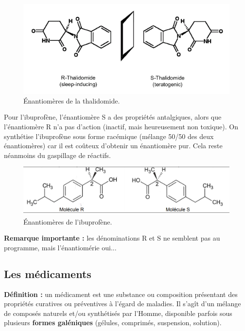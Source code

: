 \documentclass[11pt,a4paper]{report}
\begin{document}
\begin{figure}[h!]
	\begin{center}
  		\includegraphics[scale = 0.8]{thalidomide.png}
	\caption{Énantiomères de la thalidomide.}
	\end{center}
\end{figure}

Pour l'ibuprofène, l'énantiomère S a des propriétés antalgiques, alors que l'énantiomère R n'a pas d'action (inactif, mais heureusement non toxique). On synthétise l'ibuprofène sous forme racémique (mélange 50/50 des deux énantiomères) car il est coûteux d'obtenir un énantiomère pur. Cela reste néanmoins du gaspillage de réactifs.\\

\begin{figure}[h!]
	\begin{center}
  		\includegraphics[scale = 0.5]{ibuprofene.png}
	\caption{Énantiomères de l'ibuprofène.}
	\end{center}
\end{figure}

\textbf{Remarque importante :} les dénominations R et S ne semblent pas au programme, mais l'énantiomérie oui...

\newpage
\subsection{Les médicaments}

\textbf{Définition :} un médicament est une substance ou composition présentant des propriétés curatives ou préventives à l'égard de maladies. Il s'agît d'un mélange de composés naturels et/ou synthétisés par l'Homme, disponible parfois sous plusieurs \textbf{formes galéniques} (gélules, comprimés, suspension, solution).\\ 
\end{document}
